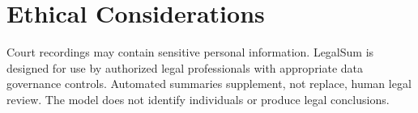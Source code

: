 \documentclass[letterpaper]{article}
\begin{document}
\section*{Ethical Considerations}

Court recordings may contain sensitive personal information. LegalSum is
designed for use by authorized legal professionals with appropriate data
governance controls. Automated summaries supplement, not replace, human legal
review. The model does not identify individuals or produce legal conclusions.



\end{document}
